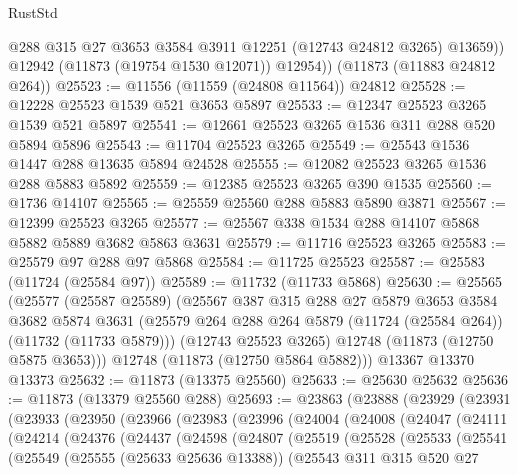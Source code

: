 \begin{lexlean}{RustStd}
\begin{coremodule}
            @288
            @315
            @27
            @3653
            @3584
            @3911
            @12251
            (@12743 @24812 @3265)
            @13659))
        @12942
        (@11873 (@19754 @1530 @12071))
        @12954))
    (@11873 (@11883 @24812 @264))
@25523 := @11556 (@11559 (@24808 @11564)) @24812
@25528 := @12228 @25523 @1539 @521 @3653 @5897
@25533 := @12347 @25523 @3265 @1539 @521 @5897
@25541 := @12661 @25523 @3265 @1536 @311 @288 @520 @5894 @5896
@25543 := @11704 @25523 @3265
@25549 := @25543 @1536 @1447 @288 @13635 @5894 @24528
@25555 := @12082 @25523 @3265 @1536 @288 @5883 @5892
@25559 := @12385 @25523 @3265 @390 @1535
@25560 := @1736 @14107
@25565 := @25559 @25560 @288 @5883 @5890 @3871
@25567 := @12399 @25523 @3265
@25577 := @25567 @338 @1534 @288 @14107 @5868 @5882 @5889 @3682 @5863 @3631
@25579 := @11716 @25523 @3265
@25583 := @25579 @97 @288 @97 @5868
@25584 := @11725 @25523
@25587 := @25583 (@11724 (@25584 @97))
@25589 := @11732 (@11733 @5868)
@25630 := @25565
    (@25577
      (@25587 @25589)
      (@25567
        @387
        @315
        @288
        @27
        @5879
        @3653
        @3584
        @3682
        @5874
        @3631
        (@25579 @264 @288 @264 @5879 (@11724 (@25584 @264)) (@11732 (@11733 @5879)))
        (@12743 @25523 @3265)
        @12748
        (@11873 (@12750 @5875 @3653)))
      @12748
      (@11873 (@12750 @5864 @5882)))
    @13367
    @13370
    @13373
@25632 := @11873 (@13375 @25560)
@25633 := @25630 @25632
@25636 := @11873 (@13379 @25560 @288)
@25693 := @23863
    (@23888
      (@23929
        (@23931
          (@23933
            (@23950
              (@23966
                (@23983
                  (@23996
                    (@24004
                      (@24008
                        (@24047
                          (@24111
                            (@24214
                              (@24376
                                (@24437
                                  (@24598
                                    (@24807
                                      (@25519
                                        (@25528
                                          (@25533
                                            (@25541
                                              (@25549
                                                (@25555 (@25633 @25636 @13388))
                                                (@25543
                                                  @311
                                                  @315
                                                  @520
                                                  @27

\end{coremodule}
\end{lexlean}
